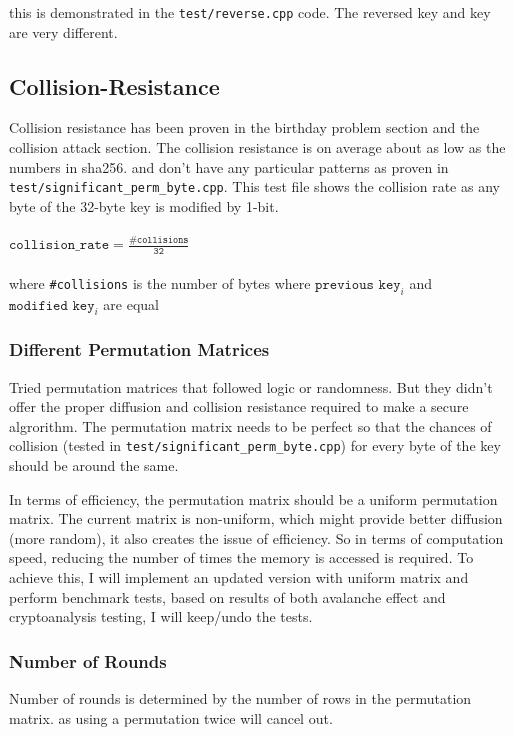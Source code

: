 \documentclass[fleqn, a4paper,12pt]{article}
\begin{document}
this is demonstrated in the \texttt{test/reverse.cpp} code. The reversed key and key are very different.

\subsection{Collision-Resistance}

Collision resistance has been proven in the birthday problem section and the collision attack section. The collision resistance is on average about as low as the numbers in sha256. and don't have any particular patterns as proven in \texttt{test/significant\_perm\_byte.cpp}. This test file shows the collision rate as any byte of the 32-byte key is modified by 1-bit.
\\\\
$\texttt{collision\_rate} = \frac{\texttt{\#collisions}}{\texttt{32}}$\\
 \\ where \texttt{\#collisions} is the number of bytes where $\texttt{previous key}_i$ and $\texttt{modified key}_i$ are equal

\subsubsection{Different Permutation Matrices}

Tried permutation matrices that followed logic or randomness. But they didn't offer the proper diffusion and collision resistance required to make a secure algrorithm. The permutation matrix needs to be perfect so that the chances of collision (tested in \texttt{test/significant\_perm\_byte.cpp}) for every byte of the key should be around the same.

In terms of efficiency, the permutation matrix should be a uniform permutation matrix. The current matrix is non-uniform, which might provide better diffusion (more random), it also creates the issue of efficiency. So in terms of computation speed, reducing the number of times the memory is accessed is required. To achieve this, I will implement an updated version with uniform matrix and perform benchmark tests, based on results of both avalanche effect and cryptoanalysis testing, I will keep/undo the tests.

\subsubsection{Number of Rounds}

Number of rounds is determined by the number of rows in the permutation matrix. as using a permutation twice will cancel out.
\end{document}
